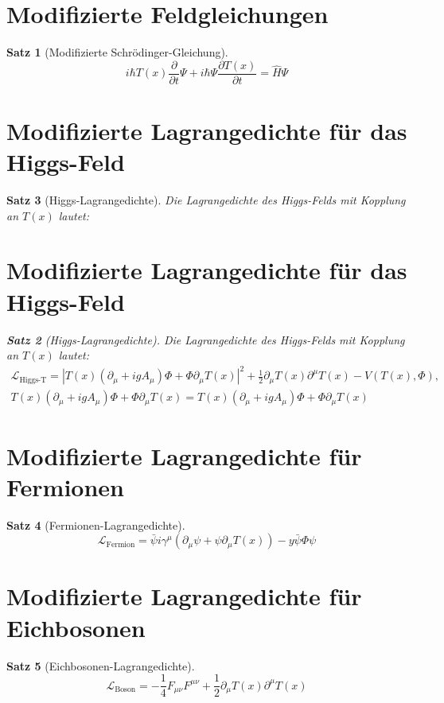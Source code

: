 \documentclass[12pt,a4paper]{article}
\newcommand{\Tfield}{T(x)}
\newcommand{\DhiggsT}{\Tfield (\partial_\mu + ig A_\mu) \Phi + \Phi \partial_\mu \Tfield} %
\newtheorem{theorem}{Satz}[section]
\theoremstyle{definition}
\theoremstyle{remark}
\begin{document}
	\section{Modifizierte Feldgleichungen}
	\begin{theorem}[Modifizierte Schrödinger-Gleichung]
		\begin{equation}
			i\hbar \Tfield \frac{\partial}{\partial t} \Psi + i\hbar \Psi \frac{\partial \Tfield}{\partial t} = \hat{H} \Psi
		\end{equation}
	\end{theorem}
	
	\section{Modifizierte Lagrangedichte für das Higgs-Feld}
	\begin{theorem}[Higgs-Lagrangedichte]
		Die Lagrangedichte des Higgs-Felds mit Kopplung an \(\Tfield\) lautet:
\section{Modifizierte Lagrangedichte für das Higgs-Feld}
\begin{theorem}[Higgs-Lagrangedichte]
	Die Lagrangedichte des Higgs-Felds mit Kopplung an \(\Tfield\) lautet:
	\begin{multline}
		\mathcal{L}_{\text{Higgs-T}} = |\DhiggsT|^2 + \frac{1}{2} \partial_\mu \Tfield \partial^\mu \Tfield - V(\Tfield, \Phi), \quad \\
		\DhiggsT = \Tfield (\partial_\mu + ig A_\mu) \Phi + \Phi \partial_\mu \Tfield
	\end{multline}
\end{theorem}
	\end{theorem}
	
	\section{Modifizierte Lagrangedichte für Fermionen}
	\begin{theorem}[Fermionen-Lagrangedichte]
		\begin{equation}
			\mathcal{L}_{\text{Fermion}} = \bar{\psi} i \gamma^\mu (\partial_\mu \psi + \psi \partial_\mu \Tfield) - y \bar{\psi} \Phi \psi
		\end{equation}
	\end{theorem}
	
	\section{Modifizierte Lagrangedichte für Eichbosonen}
	\begin{theorem}[Eichbosonen-Lagrangedichte]
		\begin{equation}
			\mathcal{L}_{\text{Boson}} = -\frac{1}{4} F_{\mu\nu} F^{\mu\nu} + \frac{1}{2} \partial_\mu \Tfield \partial^\mu \Tfield
		\end{equation}
	\end{theorem}
	
\end{document}
